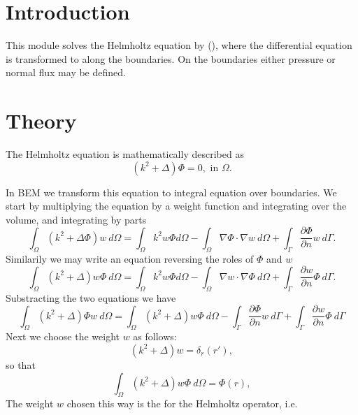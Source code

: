 
\begin{versiona}

\section{Introduction}

This module solves the Helmholtz equation by  (), where
the differential equation is transformed to  along the
boundaries. On the boundaries either pressure or normal flux may be defined.

\section{Theory}

The Helmholtz equation is mathematically described as
\begin{equation}
(k^2+\Delta ) \Phi  = 0, \mbox{ in } \Omega.
\end{equation}

In BEM we transform this equation to integral equation over boundaries. We start
by multiplying the equation by a weight function and integrating over the volume,
and integrating by parts
\begin{equation}
\int_\Omega (k^2+\Delta \Phi) w\ d\Omega  =
\int_\Omega k^2 w\Phi d\Omega -
\int_\Omega \nabla\Phi\cdot \nabla w\ d\Omega +
\int_\Gamma \frac{\partial\Phi}{\partial n} w\ d\Gamma.
\end{equation}
Similarily we may write an equation reversing the roles of $\Phi$ and $w$
\begin{equation}
\int_\Omega (k^2+\Delta) w \Phi\ d\Omega =
\int_\Omega k^2 w\Phi d\Omega -
\int_\Omega \nabla w\cdot \nabla \Phi\ d\Omega  +
\int_\Gamma \frac{\partial w}{\partial n} \Phi\ d\Gamma.
\end{equation}
Substracting the two equations we have
\begin{equation}
\int_\Omega (k^2+\Delta) \Phi w\ d\Omega =
\int_\Omega (k^2+\Delta) w \Phi\ d\Omega -
\int_\Gamma \frac{\partial\Phi}{\partial n} w\ d\Gamma +
\int_\Gamma \frac{\partial w}{\partial n} \Phi\ d\Gamma
\end{equation}
Next we choose the weight $w$ as follows:
\begin{equation}
(k^2+\Delta)w = \delta_r(r'),
\end{equation}
so that 
\begin{equation}
\int_\Omega (k^2+\Delta) w \Phi\ d\Omega = \Phi(r), 
\end{equation}
The weight $w$ chosen this way is the  for the Helmholtz operator,
i.e.


\end{versiona}
